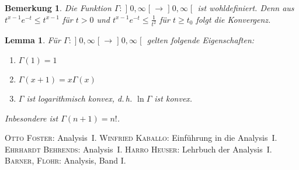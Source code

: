 \documentclass[ngerman,titlepage,twoside, parskip=half*]{scrreprt}
\theoremstyle{break}
\newtheorem{lemma}{Lemma}
\theoremstyle{nonumberbreak}
\newtheorem{remark}{Bemerkung}
\newcommand*{\bsofint}[1]{\mathopen{]}#1\mathclose{[}} %
\begin{document}
\begin{remark}
  Die Funktion $\Gamma\colon\bsofint{0,\infty}\rightarrow\bsofint{0,\infty}$
  ist wohldefiniert. Denn aus $t^{x-1}e^{-t}\leq t^{x-1}$ für $t>0$ und
  $t^{x-1}e^{-t}\leq\frac{1}{t^{2}}$ für $t\geq t_{0}$ folgt die Konvergenz.
\end{remark}

\begin{lemma}
  Für $\Gamma\colon\bsofint{0,\infty}\rightarrow\bsofint{0,\infty}$ gelten
  folgende Eigenschaften:
  \begin{enumerate}
   \item $\Gamma(1)=1$
   \item $\Gamma(x+1)= x\Gamma(x)$
   \item $\Gamma$ ist logarithmisch konvex, d.\,h. $\ln\Gamma$ ist konvex.
  \end{enumerate}
  Inbesondere ist $\Gamma(n+1)=n!$.
\end{lemma}

\clearpage
\begin{thebibliography}{99}
 \textsc{Otto Foster}: Analysis~I.
 \textsc{Winfried Kaballo}: Einführung in die Analysis~I.
 \textsc{Ehrhardt Behrends}: Analysis~I.
 \textsc{Harro Heuser}: Lehrbuch der Analysis~I.
 \textsc{Barner}, \textsc{Flohr}: Analysis, Band I.
\end{thebibliography}

\setlength{\parfillskip}{0pt plus 1fil}
\printindex
\end{document}
